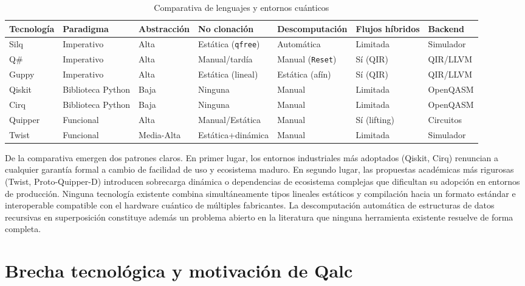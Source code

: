 \begin{table}[h]
\centering
\caption{Comparativa de lenguajes y entornos cuánticos}
\small
\begin{tabularx}{\textwidth}{|l|l|l|l|l|l|l|}
\hline
\textbf{Tecnología} & \textbf{Paradigma} & \textbf{Abstracción} & \textbf{No clonación} & \textbf{Descomputación} & \textbf{Flujos híbridos} & \textbf{Backend} \\
\hline
Silq & Imperativo & Alta & Estática (\lstinline|qfree|) & Automática & Limitada & Simulador \\
\hline
Q\# & Imperativo & Alta & Manual/tardía & Manual (\lstinline|Reset|) & Sí (QIR) & QIR/LLVM \\
\hline
Guppy & Imperativo & Alta & Estática (lineal) & Estática (afín) & Sí (QIR) & QIR/LLVM \\
\hline
Qiskit & Biblioteca Python & Baja & Ninguna & Manual & Limitada & OpenQASM \\
\hline
Cirq & Biblioteca Python & Baja & Ninguna & Manual & Limitada & OpenQASM \\
\hline
Quipper & Funcional & Alta & Manual/Estática & Manual & Sí (lifting) & Circuitos \\
\hline
Twist & Funcional & Media-Alta & Estática+dinámica & Manual & Limitada & Simulador \\
\hline
\end{tabularx}
\end{table}

De la comparativa emergen dos patrones claros. En primer lugar, los entornos industriales más adoptados (Qiskit, Cirq) renuncian a cualquier garantía formal a cambio de facilidad de uso y ecosistema maduro. En segundo lugar, las propuestas académicas más rigurosas (Twist, Proto-Quipper-D) introducen sobrecarga dinámica o dependencias de ecosistema complejas que dificultan su adopción en entornos de producción. Ninguna tecnología existente combina simultáneamente tipos lineales estáticos y compilación hacia un formato estándar e interoperable compatible con el hardware cuántico de múltiples fabricantes. La descomputación automática de estructuras de datos recursivas en superposición constituye además un problema abierto en la literatura que ninguna herramienta existente resuelve de forma completa.

\section{Brecha tecnológica y motivación de Qalc}

